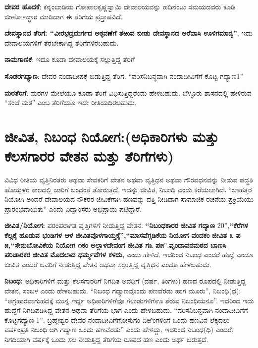 \textbf{ದೇವರ ಹೊದಕೆ}: ಕನ್ನಂಬಾಡಿಯ ಗೋಪಾಲಕೃಷ್ಣಸ್ವಾಮಿ ದೇವಾಲಯವನ್ನು ಹದಿನೆಂಟು ಸಮಯದವರು ಕೂಡಿ ಜೀರ್ಣೋದ್ಧಾರ ಮಾಡಿದಾಗ ಈ ತೆರಿಗೆಯ ಪ್ರಸ್ತಾಪವಿದೆ. 

\textbf{ದೇವಸ್ಥಾನದ ತೆರಿಗೆ: “ವೀರಭದ್ರದುರ್ಗದ ಅಠ್ಠವಣೆಗೆ ತೆಱುವ ಬೀಡು ದೇವಸ್ಥಾನದ ಅರೆವಾಸಿ ಊಳಿಗಮಾನ್ಯ”}, ಇದು ದೇವಾಲಯಗಳಿಗೆ ತೆರಬೇಕಾಗಿದ್ದ ತೆರಿಗೆಗಳಿರಬಹುದು.

\textbf{ನಾಮಗಾಣಿಕೆ}: ಇದೂ ಕೂಡಾ ದೇವಾಲಯಕ್ಕೆ ಸಲ್ಲುತ್ತಿದ್ದ ತೆರಿಗೆ

\textbf{ಸೊಡರಗದ್ಯಾಣ}: ದೇವರ ನಂದಾದೀಪಕ್ಕೆ ಬಿಡುತ್ತಿದ್ದ ತೆರಿಗೆ. “ವರಿಸನಿಬನ್ಧವಾಗಿ ನಂದಾದೀವಿಗೆಗೆ ಕೊಟ್ಟ ಗದ್ಯಾಣ1”

\textbf{ಮಠತೆರಿಗೆ}: ಮಠಗಳ ಮೇಲೆಯೂ ಕೂಡಾ ತೆರಿಗೆ ವಿಧಿಸುತ್ತಿದ್ದರೆಂದು ಹೇಳಬಹುದು. ಬೆಳ್ಳೂರು ಶಾಸನದಲ್ಲಿ ಹೇಳಿರುವ “ಸಂಜೆ ಮಠ” ಎಂಬ ತೆರಿಗೆಯೂ ಇದೇ ರೀತಿಯದಿರಬಹುದು.


\section{ಜೀವಿತ, ನಿಬಂಧ ನಿಯೋಗ:(ಅಧಿಕಾರಿಗಳು ಮತ್ತು ಕೆಲಸಗಾರರ ವೇತನ ಮತ್ತು ತೆರಿಗೆಗಳು)}

ವಿವಿಧ ರೀತಿಯ ವೃತ್ತಿನಿರತರು ಅಥವಾ ಸೇವಕರಿಗೆ ವೇತನ ಅಥವಾ ವೃತ್ತಿಧನ ಅಥವಾ ಗೌರವಧನವನ್ನು ನೀಡುವ ಪದ್ಧತಿ ಹೊಯ್ಸಳರ ಕಾಲದಲ್ಲಿ ಜಾರಿಗೆ ಬಂದಂತೆ ತೋರುತ್ತದೆ. ಇದನ್ನು ಜೀವಿತ, ನಿಬಂಧಿ ಎಂದು ಕರೆಯಲಾಗಿದೆ\textbf{. }“ಬಾಹತ್ತರ ನಿಯೋಗಿ ಅಂದರೆ ದೇವಾಲಯದ ನೌಕರರ ಜೀವಿಕೆಗಾಗಿ ಹಣವನ್ನು ದತ್ತಿ ನೀಡಿದಾಗ ಸಾಮಾಜಿಕ ರಚನೆಯ ಪ್ರಕ್ರಿಯೆಯು ಪ್ರಾರಂಭವಾಯಿತು” ಎಂದು ವಿದ್ವಾಂಸರು ಅಭಿಪ್ರಾಯ ಪಟಿದ್ದಾರೆ.

\textbf{ಜೀವಿತ/ನಿಯೋಗ: } ಪರಂಪರಾಗತ ವೃತ್ತಿಗಳಿಗೆ ನೀಡುತ್ತಿದ್ದ ವೇತನ. \textbf{“ನಿಬಂಧಕಾರರ ಜೀವಿತ ಗದ್ಯಾಣ} 20”,\textbf{“ಕೆರೆಗಳ ಕೆಲ್ಸಕ್ಕೆ ಹೂಡುವ ಭಂಡಿಗಳ ಆಳ ಜೀವಿತವೊಳಗಾಯ್ತಕ್ಕೆ”,}\textbf{“ಮಾಸವೆಗ್ಗಡಿಕೆಯ ನಿಯೋಗ ವಂದಕಂ} \textbf{ಜೀವಿತ ೩ ಪ ೫,}\textbf{“ಸೇನುಬೋವಿಕೆಯ ನಿಯೋಗ ೧ಕಂ ಅಲ್ಲಾಳದೇವಂಗೆ ಜೀವಿತ ಗ೩ ಪ೫}”,\textbf{ವೃಂದಾವನಮಠದ ಬಾಣಸಿ ಪರಿಚಾರಕರ ಜೀವಿತ ಮೊದಲಾದ ಧರ್ಮ್ಮವೆಗಳ ಕಳದು,} ಎಂದು ಹೇಳಿದೆ. ಇದರಿಂದ ನಿಬಂಧ ಎಂದರೆ ಹುದ್ದೆ ಎಂದೂ ಜೀವಿತ ಎಂದರೆ ಅವರಿಗೆ ನೀಡುತ್ತಿದ್ದ ವೇತನ ಅಥವಾ ಸಲ್ಲುತ್ತಿದ್ದ ವೃತ್ತಿಧನ ಎಂದೂ ಹೇಳಬಹುದು.

\textbf{ನಿಬಂಧ:} ಅಧಿಕಾರಿಗಳಿಗೆ ಮತ್ತು ಕೆಲಸಗಾರರಿಗೆ ನಿಗದಿತ ಅವಧಿಗೆ (ವರ್ಷ, ತಿಂಗಳು) ಹಣದ ರೂಪದಲ್ಲಿ ನೀಡುತ್ತಿದ್ದ ವೇತನ, ಸಂಬಳ ಎಂದು ಹೇಳಬಹುದು. “ನಿಬಂಧ ಗದ್ಯಾಣವೊಂದು ಪಣವೆರಡು ಹಾಗ ಮೂರು”, ನಿಬಂಧಿ(ಧ):\textbf{ }“ಅಗ್ರಹಾರವಾಗುಹದಕ್ಕೆ ಮುನ್ನ ಇರ್ದ್ದ ಅಧಿಕಾರಿಗಳಿಗೆವೂ ಗಉಡುಗಳಿಗೆಊ ತೆರುವ ನಿಬಂಧಿಯನೂ”. ಇದರಿಂದ ಇದು ಹುದ್ದೆಗೆ ನಿಗದಿಪಡಿಸಿದ್ದ ವೇತನ ಅಥವಾ ತೆರಿಗೆಯ ಭಾಗ ಎಂದು ಹೇಳಬಹುದು. “ವರಿಸನಿಬನ್ದವಾಗಿ ನಂದಾದೀವಿಗೆಗೆ ಕೊಟ್ಟಗದ್ಯಾಣ 1”, ಬ್ರಹ್ಮೇಶ್ವರ ದೇವರ ನಂದಾದೀವಿಗೆಗೋಸುಗಂ ಏಱಿಂಗಳಿಂಗೆ ಒಂದು ಹಣವಿನ ಲೆಕ್ಕದಲು ವರ್ಷಂಪ್ರತಿ ನಿಬಂಧಿ ಆಗಿ ಗದ್ಯಾಣ ಒಂದು ಹಣವೆರಡು” ಎಂದು ಹೇಳಿದ್ದು, ಇದರಿಂದ ನಿಬಂಧ(ಧಿ) ಎಂದರೆ, ನಿಗದಿಯಾಗಿ ವರ್ಷಕ್ಕೆ ಒಂದು ಸಲ ನೀಡುತ್ತಿದ್ದ ತೆರಿಗೆಯ ರೂಪದ ಹಣ ಎಂದು ಅರ್ಥ ಬರುತ್ತದೆ.

